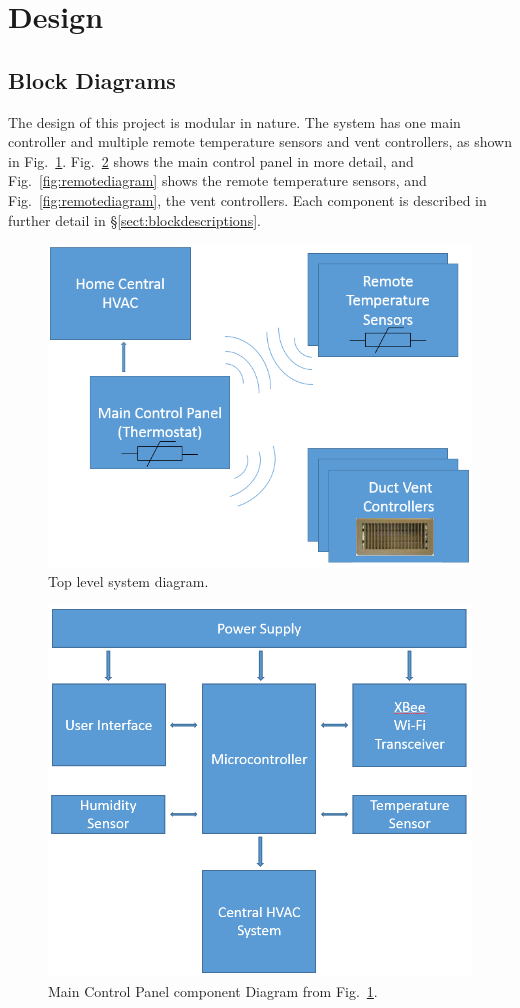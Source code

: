 \section{Design}
\subsection{Block Diagrams}
The design of this project is modular in nature. The system has  one main controller and
multiple remote temperature sensors and vent controllers, as shown in Fig.~\ref{fig:maindiagram}. Fig.~\ref{fig:cntldiagram}  shows the main control panel in more detail, and Fig.~\ref{fig:remotediagram}  shows the remote temperature sensors, and Fig.~\ref{fig:remotediagram}, the vent controllers.  Each component is described in further detail in \S\ref{sect:blockdescriptions}.

\begin{figure}[htb]
\centering
\includegraphics[width=.9\textwidth]{OverallDiagram.png}
\caption{Top level system diagram.}
\label{fig:maindiagram}
\end{figure}

\begin{figure}[htb]
\centering
\includegraphics[width=.9\textwidth]{MainCntlBlockDiagram.png}
\caption{Main Control Panel component Diagram from Fig.~\ref{fig:maindiagram}.}
\label{fig:cntldiagram}
\end{figure}

